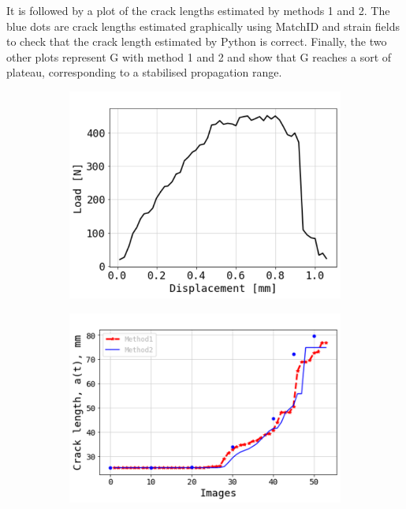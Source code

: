 \documentclass[3p,times,procedia]{elsarticle}
\begin{document}
It is followed by a plot of the crack lengths estimated by methods 1 and 2. The blue dots are crack lengths estimated graphically using MatchID and strain fields to check that the crack length estimated by Python is correct. Finally, the two other plots represent G with method 1 and 2 and show that G reaches a sort of plateau, corresponding to a stabilised propagation range.

\begin{figure}[t]
	\centering
	\begin{subfigure}[b]{0.475\textwidth}
		\centering
		\includegraphics[width=.9\textwidth]{Fig2a}
		\caption{}
		\label{fig:image1}
	\end{subfigure}
	\hfill
	\begin{subfigure}[b]{0.475\textwidth}
		\centering
		\includegraphics[width=.95\textwidth]{Fig2b}
		\caption{}
		\label{fig:image2}
	\end{subfigure}

\end{figure}
\end{document}
